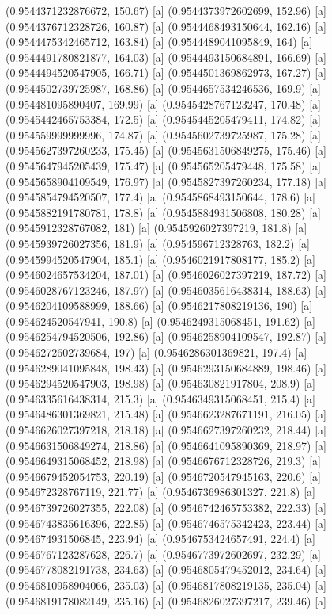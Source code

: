 {{{(0.9544371232876672, 150.67) [a] 
(0.9544373972602699, 152.96) [a] 
(0.9544376712328726, 160.87) [a] 
(0.9544468493150644, 162.16) [a] 
(0.9544475342465712, 163.84) [a] 
(0.9544489041095849, 164) [a] 
(0.9544491780821877, 164.03) [a] 
(0.9544493150684891, 166.69) [a] 
(0.9544494520547905, 166.71) [a] 
(0.9544501369862973, 167.27) [a] 
(0.9544502739725987, 168.86) [a] 
(0.9544657534246536, 169.9) [a] 
(0.954481095890407, 169.99) [a] 
(0.9545428767123247, 170.48) [a] 
(0.9545442465753384, 172.5) [a] 
(0.9545445205479411, 174.82) [a] 
(0.954559999999996, 174.87) [a] 
(0.9545602739725987, 175.28) [a] 
(0.9545627397260233, 175.45) [a] 
(0.9545631506849275, 175.46) [a] 
(0.9545647945205439, 175.47) [a] 
(0.954565205479448, 175.58) [a] 
(0.9545658904109549, 176.97) [a] 
(0.9545827397260234, 177.18) [a] 
(0.9545854794520507, 177.4) [a] 
(0.9545868493150644, 178.6) [a] 
(0.9545882191780781, 178.8) [a] 
(0.9545884931506808, 180.28) [a] 
(0.9545912328767082, 181) [a] 
(0.9545926027397219, 181.8) [a] 
(0.9545939726027356, 181.9) [a] 
(0.954596712328763, 182.2) [a] 
(0.9545994520547904, 185.1) [a] 
(0.9546021917808177, 185.2) [a] 
(0.9546024657534204, 187.01) [a] 
(0.9546026027397219, 187.72) [a] 
(0.9546028767123246, 187.97) [a] 
(0.9546035616438314, 188.63) [a] 
(0.9546204109588999, 188.66) [a] 
(0.9546217808219136, 190) [a] 
(0.954624520547941, 190.8) [a] 
(0.9546249315068451, 191.62) [a] 
(0.9546254794520506, 192.86) [a] 
(0.9546258904109547, 192.87) [a] 
(0.9546272602739684, 197) [a] 
(0.9546286301369821, 197.4) [a] 
(0.9546289041095848, 198.43) [a] 
(0.9546293150684889, 198.46) [a] 
(0.9546294520547903, 198.98) [a] 
(0.954630821917804, 208.9) [a] 
(0.9546335616438314, 215.3) [a] 
(0.9546349315068451, 215.4) [a] 
(0.9546486301369821, 215.48) [a] 
(0.9546623287671191, 216.05) [a] 
(0.9546626027397218, 218.18) [a] 
(0.9546627397260232, 218.44) [a] 
(0.9546631506849274, 218.86) [a] 
(0.9546641095890369, 218.97) [a] 
(0.9546649315068452, 218.98) [a] 
(0.9546676712328726, 219.3) [a] 
(0.9546679452054753, 220.19) [a] 
(0.9546720547945163, 220.6) [a] 
(0.954672328767119, 221.77) [a] 
(0.9546736986301327, 221.8) [a] 
(0.9546739726027355, 222.08) [a] 
(0.9546742465753382, 222.33) [a] 
(0.9546743835616396, 222.85) [a] 
(0.9546746575342423, 223.44) [a] 
(0.954674931506845, 223.94) [a] 
(0.9546753424657491, 224.4) [a] 
(0.9546767123287628, 226.7) [a] 
(0.9546773972602697, 232.29) [a] 
(0.9546778082191738, 234.63) [a] 
(0.9546805479452012, 234.64) [a] 
(0.9546810958904066, 235.03) [a] 
(0.9546817808219135, 235.04) [a] 
(0.9546819178082149, 235.16) [a] 
(0.9546826027397217, 239.46) [a] 
}}}
